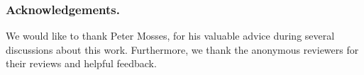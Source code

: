 \documentclass[runningheads]{llncs}
\begin{document}
\subsubsection*{Acknowledgements.}

We would like to thank Peter Mosses, for his valuable advice during several
discussions about this work. Furthermore, we thank the anonymous reviewers for
their reviews and helpful feedback.


\end{document}
